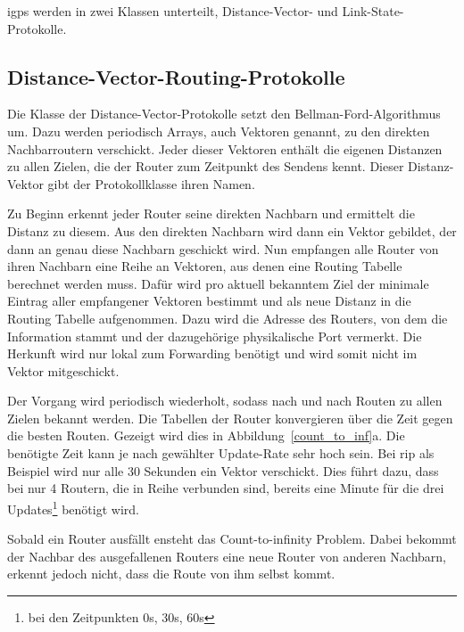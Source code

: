 \documentclass[11pt,a4paper,final]{article}
\begin{document}
\ac{igp}s werden in zwei Klassen unterteilt, Distance-Vector- und Link-State-Protokolle.
\subsection{Distance-Vector-Routing-Protokolle}
Die Klasse der Distance-Vector-Protokolle setzt den Bellman-Ford-Algorithmus um. Dazu werden periodisch Arrays, auch Vektoren genannt, zu den direkten Nachbarroutern verschickt. Jeder dieser Vektoren enthält die eigenen Distanzen zu allen Zielen, die der Router zum Zeitpunkt des Sendens kennt. Dieser Distanz-Vektor gibt der Protokollklasse ihren Namen.

Zu Beginn erkennt jeder Router seine direkten Nachbarn und ermittelt die Distanz zu diesem. Aus den direkten Nachbarn wird dann ein Vektor gebildet, der dann an genau diese Nachbarn geschickt wird. Nun empfangen alle Router von ihren Nachbarn eine Reihe an Vektoren, aus denen eine Routing Tabelle berechnet werden muss. Dafür wird pro aktuell bekanntem Ziel der minimale Eintrag aller empfangener Vektoren bestimmt und als neue Distanz in die Routing Tabelle aufgenommen. Dazu wird die Adresse des Routers, von dem die Information stammt und der dazugehörige physikalische Port vermerkt. Die Herkunft wird nur lokal zum Forwarding benötigt und wird somit nicht im Vektor mitgeschickt.

Der Vorgang wird periodisch wiederholt, sodass nach und nach Routen zu allen Zielen bekannt werden. Die Tabellen der Router konvergieren über die Zeit gegen die besten Routen. Gezeigt wird dies in Abbildung~\ref{count_to_inf}a. Die benötigte Zeit kann je nach gewählter Update-Rate sehr hoch sein. Bei \ac{rip} als Beispiel wird nur alle 30 Sekunden ein Vektor verschickt. Dies führt dazu, dass bei nur 4 Routern, die in Reihe verbunden sind, bereits eine Minute für  die drei Updates\footnote{bei den Zeitpunkten 0s, 30s, 60s} benötigt wird.

Sobald ein Router ausfällt ensteht das Count-to-infinity Problem.
Dabei bekommt der Nachbar des ausgefallenen Routers eine neue Router von anderen Nachbarn, erkennt jedoch nicht, dass die Route von ihm selbst kommt.
\end{document}
